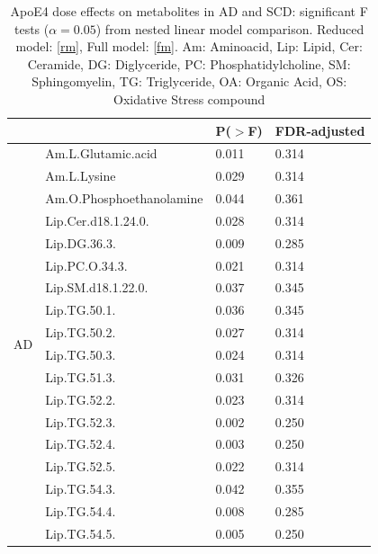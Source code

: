 \documentclass{amsart}
\begin{document}
\begin{table}[H]
\caption{ApoE4 dose effects on metabolites in AD and SCD: significant F tests ($\alpha=0.05$) from nested linear model comparison. Reduced model: \eqref{rm}, Full model: \eqref{fm}. Am: Aminoacid, Lip: Lipid, Cer: Ceramide, DG: Diglyceride, PC: Phosphatidylcholine, SM: Sphingomyelin, TG: Triglyceride, OA: Organic Acid, OS: Oxidative Stress compound}
\label{tab:nestedF}
\begin{tabular}{clll} \toprule
&                           & P($>$F) & FDR-adjusted \\ \midrule
\multirow{29}{*}{AD} & Am.L.Glutamic.acid        & 0.011              & 0.314        \\
& Am.L.Lysine                & 0.029              & 0.314        \\
& Am.O.Phosphoethanolamine      & 0.044              & 0.361        \\
& Lip.Cer.d18.1.24.0.           & 0.028              & 0.314        \\
& Lip.DG.36.3.                  & 0.009              & 0.285        \\
& Lip.PC.O.34.3.                & 0.021              & 0.314        \\
& Lip.SM.d18.1.22.0.            & 0.037              & 0.345        \\
& Lip.TG.50.1.                  & 0.036              & 0.345        \\
& Lip.TG.50.2.                  & 0.027              & 0.314        \\
& Lip.TG.50.3.                  & 0.024              & 0.314        \\
& Lip.TG.51.3.                  & 0.031              & 0.326        \\
& Lip.TG.52.2.                  & 0.023              & 0.314        \\
& Lip.TG.52.3.                  & 0.002              & 0.250        \\
& Lip.TG.52.4.                  & 0.003              & 0.250        \\
& Lip.TG.52.5.                  & 0.022              & 0.314        \\
& Lip.TG.54.3.                  & 0.042              & 0.355        \\
& Lip.TG.54.4.                  & 0.008              & 0.285        \\
& Lip.TG.54.5.                  & 0.005              & 0.250        \\

\end{tabular}
\end{table}
\end{document}
